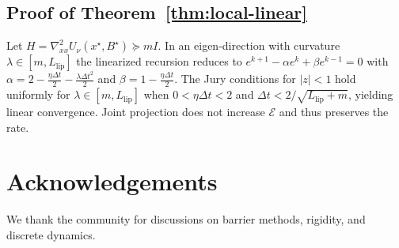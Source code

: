 \documentclass[11pt]{article}
\theoremstyle{remark}
\theoremstyle{definition}
\newcommand{\Llip}{L_{\text{lip}}}
\begin{document}
\subsection{Proof of Theorem~\ref{thm:local-linear}}
Let $H=\nabla^2_{xx} U_\nu(x^\star,B^\star)\succeq mI$. In an eigen-direction with curvature $\lambda\in[m,\Llip]$ the linearized recursion reduces to
$e^{k+1}-\alpha e^k+\beta e^{k-1}=0$ with $\alpha=2-\tfrac{\eta\Delta t}{2}-\tfrac{\lambda\Delta t^2}{2}$ and $\beta=1-\tfrac{\eta\Delta t}{2}$.
The Jury conditions for $|z|<1$ hold uniformly for $\lambda\in[m,\Llip]$ when $0<\eta\Delta t<2$ and $\Delta t<2/\sqrt{\Llip+m}$, yielding linear convergence. Joint projection does not increase $\mathcal{E}$ and thus preserves the rate.

\section*{Acknowledgements}
We thank the community for discussions on barrier methods, rigidity, and discrete dynamics.
\end{document}
